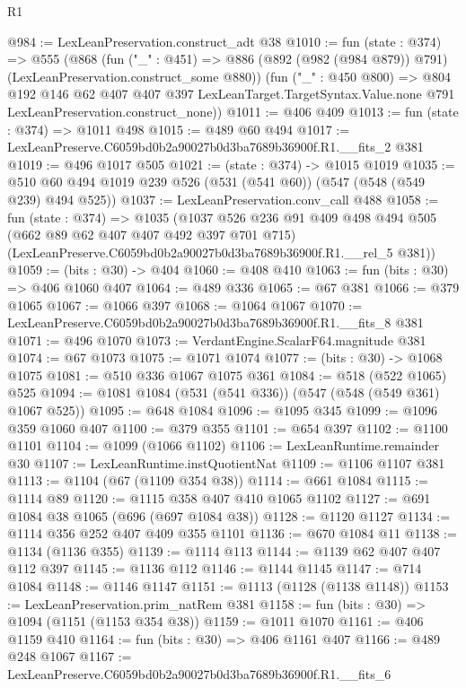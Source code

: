 \begin{lexlean}{R1}
\begin{coremodule}
@984 := LexLeanPreservation.construct_adt @38
@1010 := fun (state : @374) =>
  @555
    (@868
      (fun ("_" : @451) =>
      @886 (@892 (@982 (@984 @879)) @791) (LexLeanPreservation.construct_some @880))
      (fun ("_" : @450 @800) =>
      @804
        @192
        @146
        @62
        @407
        @407
        @397
        LexLeanTarget.TargetSyntax.Value.none
        @791
        LexLeanPreservation.construct_none))
@1011 := @406 @409
@1013 := fun (state : @374) => @1011 @498
@1015 := @489 @60 @494
@1017 := LexLeanPreserve.C6059bd0b2a90027b0d3ba7689b36900f.R1.__fits_2 @381
@1019 := @496 @1017 @505
@1021 := (state : @374) -> @1015 @1019
@1035 := @510 @60 @494 @1019 @239 @526 (@531 (@541 @60)) (@547 (@548 (@549 @239) @494 @525))
@1037 := LexLeanPreservation.conv_call @488
@1058 := fun (state : @374) =>
  @1035
    (@1037
      @526
      @236
      @91
      @409
      @498
      @494
      @505
      (@662 @89 @62 @407 @407 @492 @397 @701 @715)
      (LexLeanPreserve.C6059bd0b2a90027b0d3ba7689b36900f.R1.__rel_5 @381))
@1059 := (bits : @30) -> @404
@1060 := @408 @410
@1063 := fun (bits : @30) => @406 @1060 @407
@1064 := @489 @336
@1065 := @67 @381
@1066 := @379 @1065
@1067 := @1066 @397
@1068 := @1064 @1067
@1070 := LexLeanPreserve.C6059bd0b2a90027b0d3ba7689b36900f.R1.__fits_8 @381
@1071 := @496 @1070
@1073 := VerdantEngine.ScalarF64.magnitude @381
@1074 := @67 @1073
@1075 := @1071 @1074
@1077 := (bits : @30) -> @1068 @1075
@1081 := @510 @336 @1067 @1075 @361
@1084 := @518 (@522 @1065) @525
@1094 := @1081 @1084 (@531 (@541 @336)) (@547 (@548 (@549 @361) @1067 @525))
@1095 := @648 @1084
@1096 := @1095 @345
@1099 := @1096 @359 @1060 @407
@1100 := @379 @355
@1101 := @654 @397
@1102 := @1100 @1101
@1104 := @1099 (@1066 @1102)
@1106 := LexLeanRuntime.remainder @30
@1107 := LexLeanRuntime.instQuotientNat
@1109 := @1106 @1107 @381
@1113 := @1104 (@67 (@1109 @354 @38))
@1114 := @661 @1084
@1115 := @1114 @89
@1120 := @1115 @358 @407 @410 @1065 @1102
@1127 := @691 @1084 @38 @1065 (@696 (@697 @1084 @38))
@1128 := @1120 @1127
@1134 := @1114 @356 @252 @407 @409 @355 @1101
@1136 := @670 @1084 @11
@1138 := @1134 (@1136 @355)
@1139 := @1114 @113
@1144 := @1139 @62 @407 @407 @112 @397
@1145 := @1136 @112
@1146 := @1144 @1145
@1147 := @714 @1084
@1148 := @1146 @1147
@1151 := @1113 (@1128 (@1138 @1148))
@1153 := LexLeanPreservation.prim_natRem @381
@1158 := fun (bits : @30) => @1094 (@1151 (@1153 @354 @38))
@1159 := @1011 @1070
@1161 := @406 @1159 @410
@1164 := fun (bits : @30) => @406 @1161 @407
@1166 := @489 @248 @1067
@1167 := LexLeanPreserve.C6059bd0b2a90027b0d3ba7689b36900f.R1.__fits_6

\end{coremodule}
\end{lexlean}
